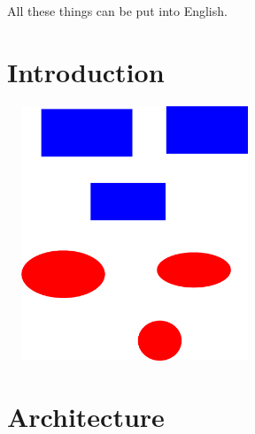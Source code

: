 \documentclass[a4paper,12pt]{article}
\begin{document}
All these things can be put into English.


\section{Introduction}

\includegraphics[width=3in,height=3in]{drawing.eps}


\section{Architecture}


\nocite{*}


\end{document}
